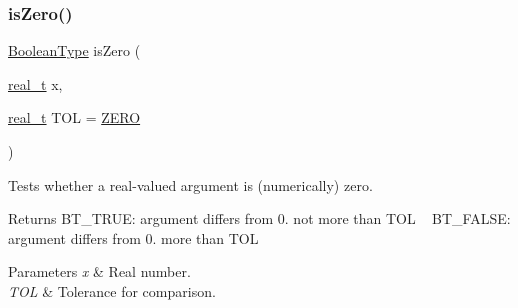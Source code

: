 \subsubsection{\texorpdfstring{is\+Zero()}{isZero()}}
{\footnotesize\ttfamily \hyperlink{_types_8hpp_a20f82124c82b6f5686a7fce454ef9089}{Boolean\+Type} is\+Zero (\begin{DoxyParamCaption}\item[{\hyperlink{qp_o_a_s_e_s__wrapper_8h_a0d00e2b3dfadee81331bbb39068570c4}{real\+\_\+t}}]{x,  }\item[{\hyperlink{qp_o_a_s_e_s__wrapper_8h_a0d00e2b3dfadee81331bbb39068570c4}{real\+\_\+t}}]{T\+OL = {\ttfamily \hyperlink{_constants_8hpp_ad819f2d51fdea4cd4ff6023e9e276e11}{Z\+E\+RO}} }\end{DoxyParamCaption})\hspace{0.3cm}{\ttfamily [inline]}}

Tests whether a real-\/valued argument is (numerically) zero. \begin{DoxyReturn}{Returns}
B\+T\+\_\+\+T\+R\+UE\+: argument differs from 0. not more than T\+OL ~\newline
 B\+T\+\_\+\+F\+A\+L\+SE\+: argument differs from 0. more than T\+OL 
\end{DoxyReturn}

\begin{DoxyParams}{Parameters}
{\em x} & Real number. \\
\hline
{\em T\+OL} & Tolerance for comparison. \\
\hline
\end{DoxyParams}
